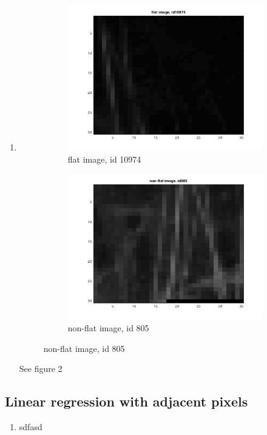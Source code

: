 \documentclass{article}
\begin{document}
\begin{enumerate}[label=(\alph*)]
				\item
				 	\begin{figure}[t]
				 		\caption{patch images}
						\begin{subfigure}{0.5\textwidth}
											      	\includegraphics[width=\linewidth]{images/p1-1-c_flat}
											      	\caption{flat image, id 10974}
											      	\label{fig:flat_patch_image}
						\end{subfigure}%
						\begin{subfigure}{0.5\textwidth}
											      	\includegraphics[width=\linewidth]{images/p1-1-c_non_flat}
											      	\caption{non-flat image, id 805}
											      	\label{fig:non-flat_patch_image}
						\end{subfigure}%
				 	\end{figure}
				 	See figure 2
			\end{enumerate}		
		\subsection{Linear regression with adjacent pixels}
			\begin{enumerate}[label=(\alph*)]
				\item
					sdfasd
			\end{enumerate}
\end{document}
